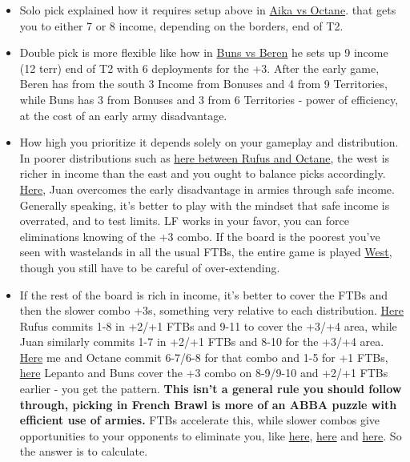 \begin{itemize}
    \item Solo pick explained how it requires setup above in \href{https://www.warzone.com/MultiPlayer?GameID=41381786}{Aika vs Octane}. that gets you to either 7 or 8 income, depending on the borders, end of T2.
    \item Double pick is more flexible like how in \href{https://www.warzone.com/MultiPlayer?GameID=33100117}{Buns vs Beren} he sets up 9 income (12 terr) end of T2 with 6 deployments for the +3. After the early game, Beren has from the south 3 Income from Bonuses and 4 from 9 Territories, while Buns has 3 from Bonuses and 3 from 6 Territories - power of efficiency, at the cost of an early army disadvantage.
    \item How high you prioritize it depends solely on your gameplay and distribution. In poorer distributions such as \href{https://www.warzone.com/MultiPlayer?GameID=34380051}{here between Rufus and Octane}, the west is richer in income than the east and you ought to balance picks accordingly. \href{https://www.warzone.com/MultiPlayer?GameID=32905758}{Here}, Juan overcomes the early disadvantage in armies through safe income. Generally speaking, it's better to play with the mindset that safe income is overrated, and to test limits. LF works in your favor, you can force eliminations knowing of the +3 combo. If the board is the poorest you've seen with wastelands in all the usual FTBs, the entire game is played \href{https://www.warzone.com/MultiPlayer?GameID=38391065}{West}, though you still have to be careful of over-extending.
    \item If the rest of the board is rich in income, it's better to cover the FTBs and then the slower combo +3s, something very relative to each distribution. \href{https://www.warzone.com/MultiPlayer?GameID=34192676}{Here} Rufus commits 1-8 in +2/+1 FTBs and 9-11 to cover the +3/+4 area, while Juan similarly commits 1-7 in +2/+1 FTBs and 8-10 for the +3/+4 area. \href{https://www.warzone.com/MultiPlayer?GameID=41419436}{Here} me and Octane commit 6-7/6-8 for that combo and 1-5 for +1 FTBs, \href{https://www.warzone.com/MultiPlayer?GameID=30854262}{here} Lepanto and Buns cover the +3 combo on 8-9/9-10 and +2/+1 FTBs earlier - you get the pattern. \textbf{This isn't a general rule you should follow through, picking in French Brawl is more of an ABBA puzzle with efficient use of armies.} FTBs accelerate this, while slower combos give opportunities to your opponents to eliminate you, like \href{https://www.warzone.com/MultiPlayer?GameID=33055938}{here}, \href{https://www.warzone.com/MultiPlayer?GameID=39666704}{here} and \href{https://www.warzone.com/MultiPlayer?GameID=26328881}{here}. So the answer is to calculate.
\end{itemize}

